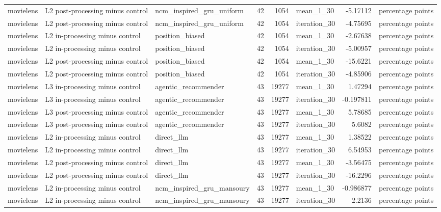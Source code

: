 \begin{table}[htbp!]
\begin{tabular}{lllrrlrl}
movielens & L2 post-processing minus control & ncm\_inspired\_gru\_uniform & 42 & 1054 & mean\_1\_30 & -5.17112 & percentage points \\
movielens & L2 post-processing minus control & ncm\_inspired\_gru\_uniform & 42 & 1054 & iteration\_30 & -4.75695 & percentage points \\
movielens & L2 in-processing minus control & position\_biased & 42 & 1054 & mean\_1\_30 & -2.67638 & percentage points \\
movielens & L2 in-processing minus control & position\_biased & 42 & 1054 & iteration\_30 & -5.00957 & percentage points \\
movielens & L2 post-processing minus control & position\_biased & 42 & 1054 & mean\_1\_30 & -15.6221 & percentage points \\
movielens & L2 post-processing minus control & position\_biased & 42 & 1054 & iteration\_30 & -4.85906 & percentage points \\
movielens & L3 in-processing minus control & agentic\_recommender & 43 & 19277 & mean\_1\_30 & 1.47294 & percentage points \\
movielens & L3 in-processing minus control & agentic\_recommender & 43 & 19277 & iteration\_30 & -0.197811 & percentage points \\
movielens & L3 post-processing minus control & agentic\_recommender & 43 & 19277 & mean\_1\_30 & 5.78685 & percentage points \\
movielens & L3 post-processing minus control & agentic\_recommender & 43 & 19277 & iteration\_30 & 5.6082 & percentage points \\
movielens & L2 in-processing minus control & direct\_llm & 43 & 19277 & mean\_1\_30 & 1.38522 & percentage points \\
movielens & L2 in-processing minus control & direct\_llm & 43 & 19277 & iteration\_30 & 6.54953 & percentage points \\
movielens & L2 post-processing minus control & direct\_llm & 43 & 19277 & mean\_1\_30 & -3.56475 & percentage points \\
movielens & L2 post-processing minus control & direct\_llm & 43 & 19277 & iteration\_30 & -16.2296 & percentage points \\
movielens & L2 in-processing minus control & ncm\_inspired\_gru\_mansoury & 43 & 19277 & mean\_1\_30 & -0.986877 & percentage points \\
movielens & L2 in-processing minus control & ncm\_inspired\_gru\_mansoury & 43 & 19277 & iteration\_30 & 2.2136 & percentage points \\

\end{tabular}
\end{table}
